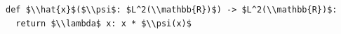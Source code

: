 \documentclass[border=10pt]{standalone}
\begin{document}
\begin{lstlisting}
def $\\hat{x}$($\\psi$: $L^2(\\mathbb{R})$) -> $L^2(\\mathbb{R})$:
  return $\\lambda$ x: x * $\\psi(x)$
\end{lstlisting}
\end{document}
